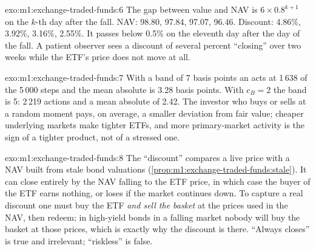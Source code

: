 \begin{solution}{exo:m1:exchange-traded-funds:6}
The gap between value and NAV is $6 \times 0.8^{k+1}$ on the $k$-th day after
the fall. NAV: 98.80, 97.84, 97.07, 96.46. Discount: 4.86\%, 3.92\%, 3.16\%,
2.55\%. It passes below 0.5\% on the eleventh day after the day of the fall.
A patient observer sees a discount of several percent ``closing'' over two
weeks while the ETF's price does not move at all.
\end{solution}

\begin{solution}{exo:m1:exchange-traded-funds:7}
With a band of 7 basis points an  acts at 1\,638 of the
5\,000 steps and the mean absolute  is 3.28 basis points. With $c_B =
2$ the band is 5: 2\,219 actions and a mean absolute  of 2.42. The
investor who buys or sells at a random moment pays, on average, a smaller
deviation from fair value; cheaper underlying markets make tighter ETFs, and
more primary-market activity is the sign of a tighter product, not of a
stressed one.
\end{solution}

\begin{solution}{exo:m1:exchange-traded-funds:8}
The ``discount'' compares a live price with a NAV built from stale bond
valuations (\cref{prop:m1:exchange-traded-funds:stale}). It can close
entirely by the NAV falling to the ETF price, in which case the buyer of the
ETF earns nothing, or loses if the market continues down. To capture a real
discount one must buy the ETF \emph{and sell the basket} at the prices used
in the NAV, then redeem; in high-yield bonds in a falling market nobody will
buy the basket at those prices, which is exactly why the discount is there.
``Always closes'' is true and irrelevant; ``riskless'' is false.
\end{solution}

